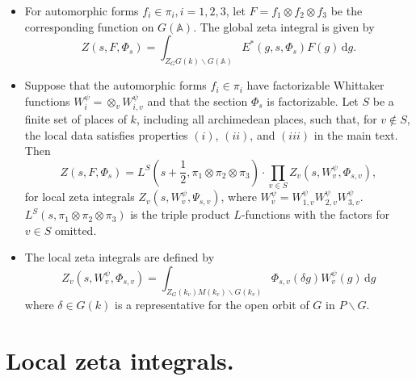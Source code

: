 \documentclass[12pt]{article}
\begin{document}
\begin{itemize}
\item For automorphic forms $f_{i} \in \pi_{i}, i = 1, 2, 3$, let $F = f_1
\otimes f_2 \otimes f_3$ be the corresponding function on
$G\left(\mathbb{A}\right)$. The global zeta integral is given by 
%
\[Z\left(s, F, \Phi_{s}\right) = \int_{Z_{G}G\left(k\right) \backslash
G\left(\mathbb{A}\right)}^{} E^{*}\left(g, s, \Phi_{s}\right) F\left(g\right) \, \mathrm{d} g.\]
%
\item Suppose that the automorphic forms $f_{i} \in \pi_{i}$ have factorizable
Whittaker functions $W_{i}^{\psi} = \otimes_{v} W_{i,v}^{\psi}$ and that the
section $\Phi_{s}$ is factorizable. Let $S$ be a finite set of places of $k$,
including all archimedean places, such that, for $v \not \in S$, the local data
satisfies properties $(i)$, $(ii)$, and $(iii)$ in the main text. Then 
%
\[Z\left(s, F, \Phi_{s}\right) = L^{S}\left(s + \frac{1}{2}, \pi_1 \otimes \pi_2
\otimes \pi_3\right) \cdot \prod_{v \in S} Z_{v}\left(s, W_{v}^{\psi}, \Phi_{s,
v}\right),\]
%
for local zeta integrals $Z_{v}\left(s, W_{v}^{\psi}, \Psi_{s, v}\right)$, where
$W_{v}^{\psi} = W_{1, v}^{\psi} W_{2, v}^{\psi} W_{3, v}^{\psi}$. $L^{S}\left(s,
\pi_1 \otimes \pi_2 \otimes \pi_3\right)$ is the triple product $L$-functions
with the factors for $v \in S$ omitted.

\item The local zeta integrals are defined by 
%
\[Z_{v}\left(s, W_{v}^{\psi}, \Phi_{s, v}\right) =
\int_{Z_{G}\left(k_{v}\right)M\left(k_{v}\right) \backslash
G\left(k_{v}\right)}^{} \Phi_{s, v}\left(\delta g\right)
W_{v}^{\psi}\left(g\right) \, \mathrm{d}g\] 
%
where $\delta \in G\left(k\right)$
is a representative for the open orbit of $G$ in $P \backslash G$.

\end{itemize}

\section{Local zeta integrals.}
\end{document}
